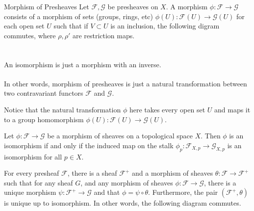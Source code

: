 \documentclass[a4paper]{article}
\begin{document}
\begin{defn}{Morphism of Presheaves}{} Let $\mathcal{F},\mathcal{G}$ be presheaves on $X$. A morphism $\phi:\mathcal{F}\to\mathcal{G}$ consists of a morphism of sets (groups, rings, etc) $\phi(U):\mathcal{F}(U)\to\mathcal{G}(U)$ for each open set $U$ such that if $V\subset U$ is an inclusion, the following digram commutes, where $\rho,\rho'$ are restriction maps. \\~\\
 \\
An isomorphism is just a morphism with an inverse. \\~\\
In other words, morphism of presheaves is just a natural transformation between two contravariant functors $\mathcal{F}$ and $\mathcal{G}$. 
\end{defn}

Notice that the natural transformation $\phi$ here takes every open set $U$ and maps it to a group homomorphism $\phi(U):\mathcal{F}(U)\to\mathcal{G}(U)$. 

\begin{prp}{}{} Let $\phi:\mathcal{F}\to\mathcal{G}$ be a morphism of sheaves on a topological space $X$. Then $\phi$ is an isomorphism if and only if the induced map on the stalk $\phi_p:\mathcal{F}_{X,p}\to\mathcal{G}_{X,p}$ is an isomorphism for all $p\in X$. 
\end{prp}

\begin{thm}{}{} For every presheaf $\mathcal{F}$, there is a sheaf $\mathcal{F}^+$ and a morphism of sheaves $\theta:\mathcal{F}\to\mathcal{F}^+$ such that for any sheaf $G$, and any morphism of sheaves $\phi:\mathcal{F}\to\mathcal{G}$, there is a unique morphism $\psi:\mathcal{F}^+\to\mathcal{G}$ and that $\phi=\psi\circ\theta$. Furthermore, the pair $(\mathcal{F}^+,\theta)$ is unique up to isomorphism. In other words, the following diagram commutes. \\~\\
 \\
\end{thm}
\end{document}
